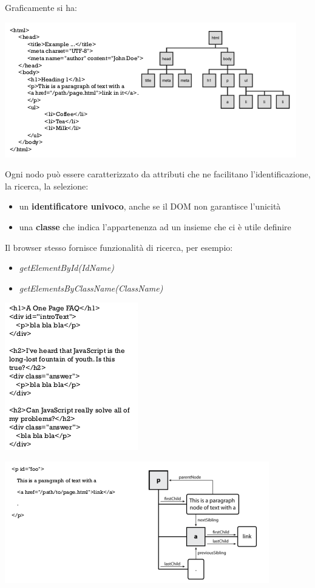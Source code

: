 \documentclass[a4paper,12pt, oneside]{book}
\begin{document}
Graficamente si ha:
\begin{center}
	\includegraphics[scale=0.9]{img/dom.png}
\end{center}
\newpage
Ogni nodo può essere caratterizzato da
attributi che ne facilitano l'identificazione, la ricerca, la selezione:
\begin{itemize}
	\item un \textbf{identificatore univoco}, anche se il DOM non garantisce l'unicità
	\item una \textbf{classe} che indica l'appartenenza ad
	      un insieme che ci è utile definire
\end{itemize}
Il browser stesso fornisce funzionalità di ricerca, per esempio:
\begin{itemize}
	\item \textit{getElementById(IdName)}
	\item \textit{getElementsByClassName(ClassName)}
\end{itemize}
\begin{center}
	\includegraphics[scale=2.9]{img/dom2.png}
\end{center}
\begin{center}
	\includegraphics[scale=0.9]{img/dom3.png}
\end{center}
\end{document}
